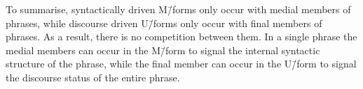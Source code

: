 \begin{exe}
	\label{ex2:160326, 18.26}
\end{exe}

To summarise, syntactically driven M\=/forms only
occur with medial members of phrases, while discourse
driven U\=/forms only occur with final members of phrases.
As a result, there is no competition between them.
In a single phrase the medial members
can occur in the M\=/form to signal the internal
syntactic structure of the phrase, while the final
member can occur in the U\=/form to signal the discourse
status of the entire phrase.